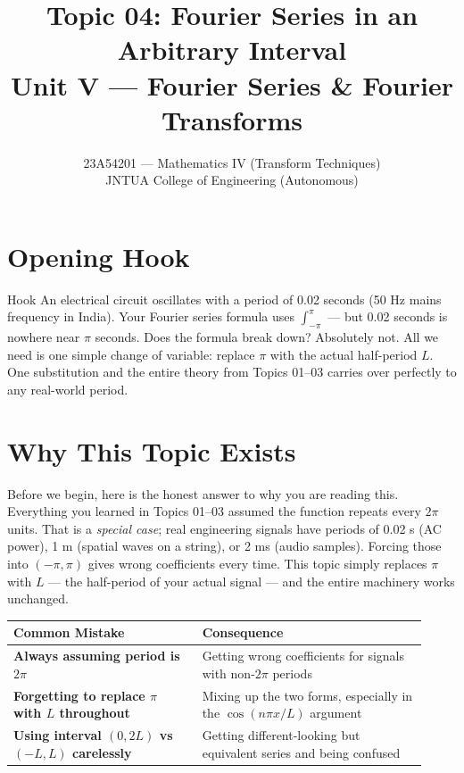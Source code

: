 \documentclass[12pt,a4paper]{article}
\title{Topic 04: Fourier Series in an Arbitrary Interval \\ \large Unit V --- Fourier Series \& Fourier Transforms}
\author{23A54201 --- Mathematics IV (Transform Techniques) \\ JNTUA College of Engineering (Autonomous)}
\date{}
\begin{document}
\maketitle
\tableofcontents
\newpage

\section{Opening Hook}

\begin{curiositybox}{Hook}
An electrical circuit oscillates with a period of 0.02 seconds (50 Hz mains frequency in India).
Your Fourier series formula uses $\int_{-\pi}^{\pi}$ --- but 0.02 seconds is nowhere near $\pi$ seconds.
Does the formula break down? Absolutely not.
All we need is one simple change of variable: replace $\pi$ with the actual half-period $L$.
One substitution and the entire theory from Topics 01--03 carries over perfectly to any real-world period.
\end{curiositybox}

\section{Why This Topic Exists}

Before we begin, here is the honest answer to why you are reading this.
Everything you learned in Topics 01--03 assumed the function repeats every $2\pi$ units.
That is a \emph{special case}; real engineering signals have periods of 0.02 s (AC power), 1 m (spatial waves on a string), or 2 ms (audio samples).
Forcing those into $(-\pi, \pi)$ gives wrong coefficients every time.
This topic simply replaces $\pi$ with $L$ --- the half-period of your actual signal --- and the entire machinery works unchanged.

\begin{center}
\begin{tabular}{>{\bfseries}p{0.42\linewidth} p{0.50\linewidth}}
\toprule
Common Mistake & Consequence \\
\midrule
Always assuming period is $2\pi$ & Getting wrong coefficients for signals with non-$2\pi$ periods \\
Forgetting to replace $\pi$ with $L$ throughout & Mixing up the two forms, especially in the $\cos(n\pi x/L)$ argument \\
Using interval $(0,2L)$ vs $(-L,L)$ carelessly & Getting different-looking but equivalent series and being confused \\
\bottomrule
\end{tabular}
\end{center}
\end{document}
